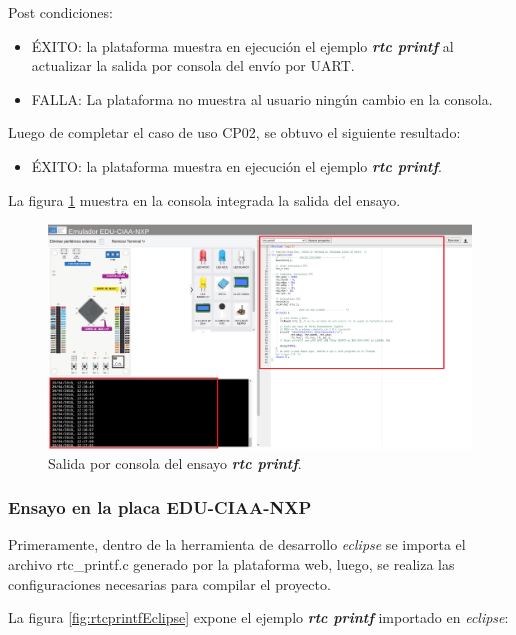 Post condiciones:
\begin{itemize}
	\item ÉXITO: la plataforma muestra en ejecución el ejemplo \textit{\textbf{rtc printf}} al actualizar la salida por consola del envío por UART.
	\item FALLA: La plataforma no muestra al usuario ningún cambio en la consola.
\end{itemize}


Luego de completar el caso de uso CP02, se obtuvo el siguiente resultado: 

\begin{itemize}
	\item ÉXITO: la plataforma muestra en ejecución el ejemplo \textit{\textbf{rtc printf}}.
\end{itemize}


La figura \ref{fig:rtcprintf} muestra en la consola integrada la salida del ensayo. 

\begin{figure}[ht]
	\centering
	\includegraphics[scale=.21]{./Figures/rtcprintf.png}
	\caption{Salida por consola del ensayo \textit{\textbf{rtc printf}}.}
	\label{fig:rtcprintf}
\end{figure}

\subsubsection{Ensayo en la placa EDU-CIAA-NXP} 

Primeramente, dentro de la herramienta de desarrollo \textit{eclipse} se importa el archivo \textquotedbl rtc\_printf.c\textquotedbl{} generado por la plataforma web, luego, se realiza las configuraciones necesarias para compilar el proyecto. 

La figura \ref{fig:rtcprintfEclipse} expone el ejemplo \textit{\textbf{rtc printf}} importado en \textit{eclipse}: 

